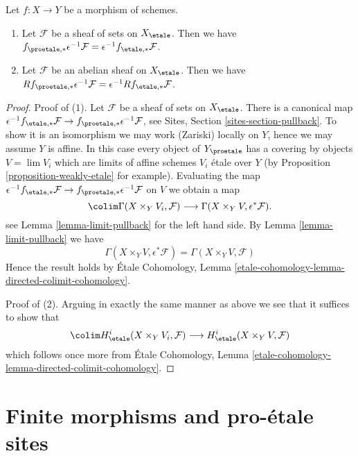 \begin{lemma}
\label{lemma-morphism-comparison}
Let $f : X \to Y$ be a morphism of schemes.
\begin{enumerate}
\item Let $\mathcal{F}$ be a sheaf of sets on $X_\etale$. Then we have
$f_{\proetale, *}\epsilon^{-1}\mathcal{F} =
\epsilon^{-1}f_{\etale, *}\mathcal{F}$.
\item Let $\mathcal{F}$ be an abelian sheaf on $X_\etale$. Then we have
$Rf_{\proetale, *}\epsilon^{-1}\mathcal{F} =
\epsilon^{-1}Rf_{\etale, *}\mathcal{F}$.
\end{enumerate}
\end{lemma}

\begin{proof}
Proof of (1). Let $\mathcal{F}$ be a sheaf of sets on $X_\etale$. There
is a canonical map $\epsilon^{-1}f_{\etale, *}\mathcal{F} \to
f_{\proetale, *}\epsilon^{-1}\mathcal{F}$, see
Sites, Section \ref{sites-section-pullback}.
To show it is an isomorphism we may work (Zariski) locally on $Y$, hence
we may assume $Y$ is affine. In this case
every object of $Y_\proetale$ has a covering by objects $V = \lim V_i$
which are limits of affine schemes $V_i$ \'etale over $Y$ (by
Proposition \ref{proposition-weakly-etale}
for example). Evaluating the map
$\epsilon^{-1}f_{\etale, *}\mathcal{F} \to
f_{\proetale, *}\epsilon^{-1}\mathcal{F}$
on $V$ we obtain a map
$$
\colim \Gamma(X \times_Y V_i, \mathcal{F})
\longrightarrow
\Gamma(X \times_Y V, \epsilon^*\mathcal{F}).
$$
see Lemma \ref{lemma-limit-pullback} for the left hand side.
By Lemma \ref{lemma-limit-pullback} we have
$$
\Gamma(X \times_Y V, \epsilon^*\mathcal{F}) =
\Gamma(X \times_Y V, \mathcal{F})
$$
Hence the result holds by
\'Etale Cohomology, Lemma
\ref{etale-cohomology-lemma-directed-colimit-cohomology}.

\medskip\noindent
Proof of (2). Arguing in exactly the same manner as above
we see that it suffices to show that
$$
\colim H^i_\etale(X \times_Y V_i, \mathcal{F})
\longrightarrow
H^i_\etale(X \times_Y V, \mathcal{F})
$$
which follows once more from \'Etale Cohomology, Lemma
\ref{etale-cohomology-lemma-directed-colimit-cohomology}.
\end{proof}







\section{Finite morphisms and pro-\'etale sites}
\label{section-finite}

